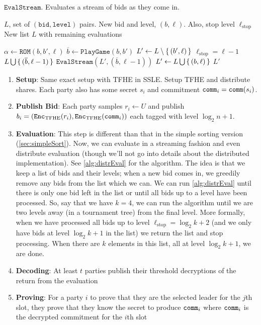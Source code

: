 \documentclass[11pt]{article}
\begin{document}
\begin{algorithm}
	\caption{$\texttt{EvalStream}$. Evaluates a stream of bids as they come in.}
	\label{alg:distrEval}
	\begin{algorithmic}
		\Require $L$, set of $(\texttt{bid}, \texttt{level})$ pairs. New bid and level, $(b, \ell)$. Also, stop level $\ell_{\mathrm{stop}}$
		\Ensure New list $L$ with remaining evaluations
		
		\State $\alpha \gets \texttt{ROM}(b, b', \ell)$
		\State $\overline{b} \gets \texttt{PlayGame}(b, b')$
		\State $L' \gets L \setminus \set{(b', \ell)}$
		\If $\ell_{\mathrm{stop}} = \ell - 1$
		\State \Return $L \bigcup \set{(\overline{b}, \ell - 1)}$
		\Else
		\State \Return $\texttt{EvalStream}(L', (\overline{b}, \ell - 1))$
		\EndIf
		\Else
		\State $L' \gets L \bigcup \set{(b, \ell)}$
		\State \Return $L'$
		\EndIf
	\end{algorithmic}
\end{algorithm}

\begin{enumerate}
	\item \textbf{Setup}: Same exact setup with TFHE in SSLE. Setup TFHE and distribute shares.
	      Each party also has some secret $s_i$ and commitment $\texttt{comm}_i = \texttt{comm}(s_i)$.
	\item \textbf{Publish Bid}: Each party samples $r_i \leftarrow U$ and publish $b_i = (\texttt{Enc}_{\mathrm{TFHE}}(r_i), \texttt{Enc}_{\mathrm{TFHE}}(\texttt{comm}_i))$ each tagged with level $\log_2 n + 1$.
	\item \textbf{Evaluation}: This step is different than that in the simple sorting version (\cref{sec:simpleSort}).
	      Now, we can evaluate in a streaming fashion and even distribute evaluation (though we'll not go into details about the distributed implementation).
	      See \cref{alg:distrEval} for the algorithm. The idea is that we keep a list of bids and their levels;
	      when a new bid comes in, we greedily remove any bids from the list which we can. We can run \cref{alg:distrEval}
	      until there is only one bid left in the list or until all bids up to a level have been processed.
	      So, say that we have $k = 4$, we can run the algorithm until we are two levels away (in a tournament tree) from the final level.
	      More formally, when we have processed all bids up to level $\ell_{\mathrm{stop}} = \log_2 k + 2$ (and we only have bids at level $\log_2 k + 1$ in the list) we return the list and stop processing.
	      When there are $k$ elements in this list, all at level $\log_2 k + 1$, we are done.

	      
	\item \textbf{Decoding}: At least $t$ parties publish their threshold decryptions of the return from the evaluation
	\item \textbf{Proving}: For a party $i$ to prove that they are the selected leader for the $j$th slot, they prove that they know the secret to produce $\texttt{comm}_i$
	      where $\texttt{comm}_i$ is the decrypted commitment for the $i$th slot
\end{enumerate}

% 




\end{document}
